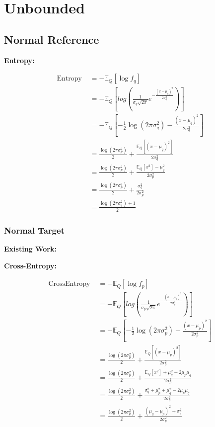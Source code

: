 \documentclass{article}
\begin{document}
\section{Unbounded}

\subsection{Normal Reference}

\noindent \textbf{Entropy:}

$$ \begin{aligned} \text { Entropy }&=-\mathbb{E}_{Q}\left[\log f_{q}\right] \\ &=-\mathbb{E}_{Q}\left[log(\frac{1}{\sigma_{q} \sqrt{2 \pi}} e^{-\frac{(x-\mu_{q})^{2}}{2 \sigma_{q}^{2}}})\right] \\ &=-\mathbb{E}_{Q}\left[-\frac{1}{2} \log \left(2 \pi \sigma_{q}^{2}\right)-\frac{\left(x-\mu_{q}\right)^{2}}{2 \sigma_{q}^{2}}\right] \\ &=\frac{\log \left(2 \pi \sigma_{p}^{2}\right)}{2}+\frac{\mathbb{E}_{Q}\left[(x-\mu_{q})^2 \right]}{2 \sigma^2_{q}}\\ &=\frac{\log \left(2 \pi \sigma_{p}^{2}\right)}{2}+\frac{\mathbb{E}_{Q}\left[x^2 \right]-\mu_{q}^{2}}{2\sigma^2_{p}}\\ &=\frac{\log \left(2 \pi \sigma_{p}^{2}\right)}{2}+\frac{\sigma_{q}^{2}}{2\sigma^2_{p}}\\ &=\frac{\log \left(2 \pi \sigma_{q}^{2}\right)+1}{2} \end{aligned} $$

\subsubsection{Normal Target}

\noindent \textbf{Existing Work:}

\noindent \textbf{Cross-Entropy:}

$$ \begin{aligned} \text { CrossEntropy }&=-\mathbb{E}_{Q}\left[\log f_{p}\right] \\ &=-\mathbb{E}_{Q}\left[log(\frac{1}{\sigma_{p} \sqrt{2 \pi}} e^{-\frac{(x-\mu_{p})^{2}}{2 \sigma_{p}^{2}}})\right] \\ &= -\mathbb{E}_{Q}\left[-\frac{1}{2} \log \left(2 \pi \sigma_{p}^{2}\right)-\frac{\left(x-\mu_{p}\right)^{2}}{2 \sigma_{p}^{2}}\right] \\ &=\frac{\log \left(2 \pi \sigma_{p}^{2}\right)}{2}+\frac{\mathbb{E}_{Q}\left[(x-\mu_{p})^2 \right]}{2 \sigma^2_{p}}\\ &=\frac{\log \left(2 \pi \sigma_{p}^{2}\right)}{2}+\frac{\mathbb{E}_{Q}\left[x^2 \right]+\mu_{q}^{2}-2\mu_{p}\mu_{q} }{2\sigma^2_{p}}\\ &=\frac{\log \left(2 \pi \sigma_{p}^{2}\right)}{2}+\frac{\sigma_{q}^{2}+\mu_{p}^{2}+\mu_{q}^{2}-2\mu_{p}\mu_{q} }{2\sigma^2_{p}}\\ &=\frac{\log \left(2 \pi \sigma_{p}^{2}\right)}{2}+\frac{\left(\mu_{q}-\mu_{p}\right)^{2}+\sigma_{q}^{2}}{2 \sigma^2_{p}} \end{aligned} $$
\end{document}
